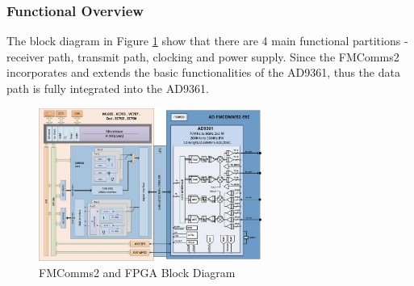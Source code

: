 \subsubsection{Functional Overview}

The block diagram in Figure \ref{fig:fmcommbd} show that there are 4 main
functional partitions - receiver path, transmit path, clocking and power supply.
Since the FMComms2 incorporates and extends the basic functionalities of the
AD9361, thus the data path is fully integrated into the AD9361.

\begin{figure}[htbp]
    \centering
    \includegraphics[width=0.65\textwidth]{./figures/fmcomms2_bd}
    \caption{ FMComms2 and FPGA Block Diagram
    \label{fig:fmcommbd}}
\end{figure}



